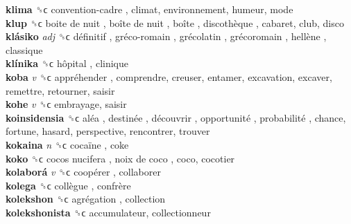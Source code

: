 \textbf{klima} ␝ϲ   convention-cadre , climat, environnement, humeur, mode  \\
\textbf{klup} ␝ϲ   boite de nuit ,  boîte de nuit ,  boîte ,  discothèque , cabaret, club, disco  \\
\textbf{klásiko} \emph{adj}  ␝ϲ   définitif ,  gréco-romain ,  grécolatin ,  grécoromain ,  hellène , classique  \\
\textbf{klínika} ␝ϲ   hôpital , clinique  \\
\textbf{koba} \emph{v}  ␝ϲ   appréhender , comprendre, creuser, entamer, excavation, excaver, remettre, retourner, saisir  \\
\textbf{kohe} \emph{v}  ␝ϲ  embrayage, saisir  \\
\textbf{koinsidensia} ␝ϲ   aléa ,  destinée ,  découvrir ,  opportunité ,  probabilité , chance, fortune, hasard, perspective, rencontrer, trouver  \\
\textbf{kokaina} \emph{n}  ␝ϲ   cocaïne , coke  \\
\textbf{koko} ␝ϲ   cocos nucifera ,  noix de coco , coco, cocotier  \\
\textbf{kolaborá} \emph{v}  ␝ϲ   coopérer , collaborer  \\
\textbf{kolega} ␝ϲ   collègue ,  confrère   \\
\textbf{kolekshon} ␝ϲ   agrégation , collection  \\
\textbf{kolekshonista} ␝ϲ  accumulateur, collectionneur  \\
